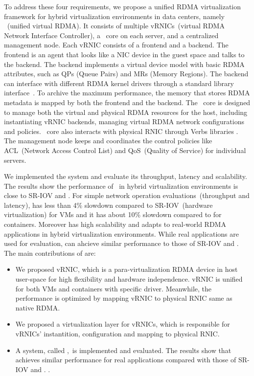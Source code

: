To address these four requirements, we propose a unified RDMA virtualization framework for hybrid virtualization environments in data centers, namely \sys~(unified virtual RDMA). It consists of multiple vRNICs~(virtual RDMA Network Interface Controller), a \sys~core on each server, and a centralized management node.
Each vRNIC consists of a frontend and a backend. The frontend is an agent that looks like a NIC device in the guest space and talks to the backend. The backend implements a virtual device model with basic RDMA attributes, such as QPs (Queue Pairs) and MRs (Memory Regions). The backend can interface with different RDMA kernel drivers through a standard library interface~\cite{verbs}. To archive the maximum performance, the memory that stores RDMA metadata is mapped by both the frontend and the backend. 
The \sys~core is designed to manage both the virtual and physical RDMA resources for the host, including instantiating vRNIC backends, managing virtual RDMA network configurations and policies. \sys~core also interacts with physical RNIC through Verbs libraries \cite{verbs}.
The management node keeps and coordinates the control policies like ACL~(Network Access Control List) and QoS~(Quality of Service) for individual servers.

We implemented the \sys system and evaluate its throughput, latency and scalability. The results show the performance of \sys~in hybrid virtualization environments is close to SR-IOV and \native. For simple network operation evaluations~(throughput and latency), \sys has less than 4\% slowdown compared to SR-IOV~(hardware virtualization) for VMs and it has about 10\% slowdown compared to \native for containers. Moreover \sys has high scalability and adapts to real-world RDMA applications in hybrid virtualization environments. While real applications are used for evaluation, \sys can ahcieve similar performance to those of SR-IOV and \native. The main contributions of \sys are:

\begin{itemize}
	\item We proposed vRNIC, which is a para-virtualization RDMA device in host user-space for high flexibility and hardware independence. vRNIC is unified for both VMs and containers with specific driver. Meanwhile, the performance is optimized by mapping vRNIC to physical RNIC same as native RDMA.
	
	\item We proposed a virtualization layer for vRNICs, which is responsible for vRNICs' instantition, configuration and mapping to physical RNIC. %
	
	\item A system, called \sys,~is implemented and evaluated. The results show that \sys achieves similar performance for real applications compared with those of SR-IOV and \native.  .
\end{itemize}

